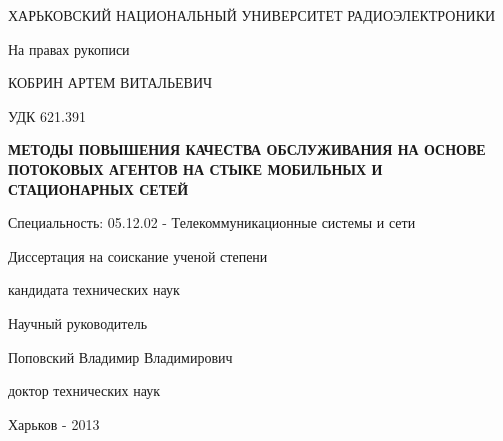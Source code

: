 \begin{titlepage}

 ХАРЬКОВСКИЙ НАЦИОНАЛЬНЫЙ УНИВЕРСИТЕТ РАДИОЭЛЕКТРОНИКИ

 \vspace*{3.5em plus .6em minus .5em}
\begin{flushright}
 На правах рукописи
\end{flushright}

 \vspace*{3.5em plus .6em minus .5em}
\MakeUppercase{Кобрин Артем Витальевич}

 \vspace*{1.5em plus .6em minus .5em}
\begin{flushright}
 УДК 621.391
\end{flushright}

 \vspace*{1.5em plus .6em minus .5em}
\MakeUppercase{\textbf{Методы повышения качества обслуживания на основе потоковых агентов на стыке мобильных и стационарных сетей}}

 \vspace*{3.5em plus .6em minus .5em}
Специальность: 05.12.02 - Телекоммуникационные системы и сети
 \vspace*{3.5em plus .6em minus .5em}
 
 Диссертация на соискание ученой степени 
 
 кандидата технических наук

  \vspace*{3em plus .6em minus .5em}
\begin{flushleft}

\hangindent=8cm  \noindent
 Научный руководитель

 Поповский Владимир Владимирович

 доктор технических наук
 
 \vspace*{3em plus .6em minus .5em}
 


\end{flushleft}

 
  \vspace*{2em plus .6em minus .5em}
 Харьков - 2013
 
\end{titlepage}
